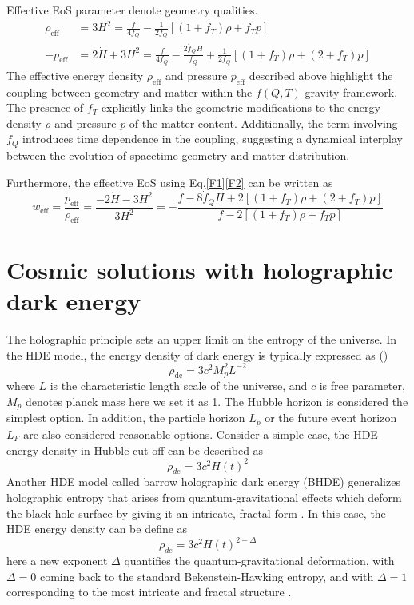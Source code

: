 \documentclass[a4paper,fleqn]{cas-sc}
\begin{document}
Effective EoS parameter denote geometry qualities.
\begin{align}
\rho_{\text{eff}}&=3H^2=\frac{f}{4f_Q}-\frac{1}{2f_Q}[(1+f_T)\rho+f_T p] \label{F1}\\
-p_{\text{eff}}&=2\dot{H}+3H^2=\frac{f}{4f_Q}-\frac{2\dot{f}_Q H}{f_Q}+\frac{1}{2f_Q}[(1+f_T)\rho +(2+f_T)p] \label{F2}
\end{align}
The effective energy density \(\rho_{\text{eff}}\) and pressure \(p_{\text{eff}}\) described above highlight the coupling between geometry and matter within the \(f(Q, T)\) gravity framework. The presence of \(f_T\) explicitly links the geometric modifications to the energy density \(\rho\) and pressure \(p\) of the matter content. Additionally, the term involving \(\dot{f}_Q\) introduces time dependence in the coupling, suggesting a dynamical interplay between the evolution of spacetime geometry and matter distribution. 

Furthermore, the effective EoS using Eq.\eqref{F1}\eqref{F2} can be written as
\begin{equation}
w_{\text{eff}}=\frac{p_{\text{eff}}}{\rho_{\text{eff}}} = \frac{-2\dot{H}-3H^2}{3H^2}= -\frac{f - 8\dot{f}_Q H + 2[(1 + f_T)\rho + (2 + f_T)p]}{f - 2[(1 + f_T)\rho + f_T p]}
\end{equation}

\section{Cosmic solutions with holographic dark energy}\label{sec:solution}

The holographic principle sets an upper limit on the entropy of the universe.  In the HDE model, the energy density of dark energy is typically expressed as (\cite{LI20041})
\begin{equation}
    \rho_\text{de} = 3c^2 M_p^2 L^{-2}
\end{equation}
where $L$ is the characteristic length scale of the universe, and $c$ is free parameter, $M_p$ denotes planck mass here we set it as 1. The Hubble horizon is considered the simplest option.  In addition, the particle horizon $L_p$ or the future event horizon $L_F$ are also considered reasonable options. Consider a simple case, the HDE energy density in Hubble cut-off can be described as 
\begin{equation}
    \rho_{de}=3c^2 H(t)^2 \label{HDE}
\end{equation}
Another HDE model called barrow holographic dark energy (BHDE) generalizes holographic entropy that arises from quantum-gravitational effects which deform the black-hole surface by giving it an intricate, fractal form . In this case, the HDE energy density can be define as
\begin{equation}
    \rho_{de}=3c^2 H(t)^{2-\Delta}\label{BHDEdef}
\end{equation}
here a new exponent $\Delta$ quantifies the quantum-gravitational deformation, with $\Delta=0$ coming back to the standard Bekenstein-Hawking entropy, and with $\Delta=1$ corresponding to the most intricate and fractal structure \cite{PhysRevD.102.123525}.
\end{document}
